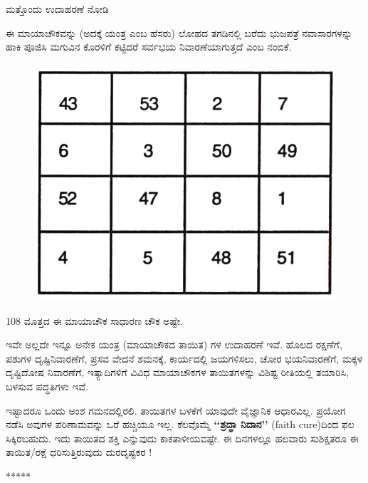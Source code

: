 ಮತ್ತೊಂದು ಉದಾಹರಣೆ ನೋಡಿ

ಈ ಮಾಯಾಚೌಕವನ್ನು (ಅದಕ್ಕೆ ಯಂತ್ರ ಎಂಬ ಹೆಸರು) ಲೋಹದ ತಗಡಿನಲ್ಲಿ ಬರೆದು ಭುಜಪತ್ರೆ ನವಾಸಾರಗಳನ್ನು ಹಾಕಿ ಪೂಜಿಸಿ ಮಗುವಿನ ಕೊರಳಿಗೆ ಕಟ್ಟಿದರೆ ಸರ್ವಭಯ ನಿವಾರಣೆಯಾಗುತ್ತದೆ ಎಂಬ ನಂಬಿಕೆ.
\begin{figure}[H]
\includegraphics{src/figures/chap11/fig11-4.jpg}
\end{figure}

108 ಮೊತ್ತದ ಈ ಮಾಯಾಚೌಕ ಸಾಧಾರಣ ಚೌಕ ಅಷ್ಟೇ.

ಇವೇ ಅಲ್ಲದೇ ಇನ್ನೂ ಅನೇಕ ಯಂತ್ರ (ಮಾಯಾಚೌಕದ ತಾಯಿತ) ಗಳ ಉದಾಹರಣೆ ಇವೆ. ಹೊಲದ ರಕ್ಷಣೆಗೆ, ಪಶುಗಳ ದೃಷ್ಟಿನಿವಾರಣೆಗೆ, ಪ್ರಸವ ವೇದನೆ ಶಮನಕ್ಕೆ, ಕಾರ್ಯದಲ್ಲಿ  ಜಯಗಳಿಸಲು, ಚೋರ ಭಯನಿವಾರಣೆಗೆ, ಮಕ್ಕಳ ದೃಷ್ಟಿದೋಷ ನಿವಾರಣೆಗೆ, ಇತ್ಯಾದಿಗಳಿಗೆ ವಿವಿಧ ಮಾಯಾಚೌಕಗಳ ತಾಯಿತಗಳನ್ನು ವಿಶಿಷ್ಟ ರೀತಿಯಲ್ಲಿ ತಯಾರಿಸಿ, ಬಳಸುವ ಪದ್ಧತಿಗಳು ಇವೆ.

ಇಷ್ಟಾದರೂ ಒಂದು ಅಂಶ ಗಮನದಲ್ಲಿರಲಿ. ತಾಯಿತಗಳ ಬಳಕೆಗೆ ಯಾವುದೇ ವೈಜ್ಞಾನಿಕ ಆಧಾರವಿಲ್ಲ. ಪ್ರಯೋಗ ನಡೆಸಿ ಅವುಗಳ ಪರಿಣಾಮವನ್ನು ಒರೆ ಹಚ್ಚಿಯೂ ಇಲ್ಲ. ಕೆಲವೊಮ್ಮೆ \textbf{‘‘ಶ್ರದ್ಧಾ ನಿದಾನ’’} (faith cure)ದಿಂದ ಫಲ ಸಿಕ್ಕಿರಬಹುದು. ಇದು ತಾಯಿತದ ಶಕ್ತಿ ಎನ್ನುವುದು ಕಾಕತಾಳೀಯವಷ್ಟೇ. ಈ ದಿನಗಳಲ್ಲೂ ಹಲವಾರು ಸುಶಿಕ್ಷತರೂ ಈ ತಾಯಿತ/ರಕ್ಷೆ ಧರಿಸುತ್ತಿರುವುದು ದುರದೃಷ್ಟಕರ !
\begin{center}
*****
\end{center}

